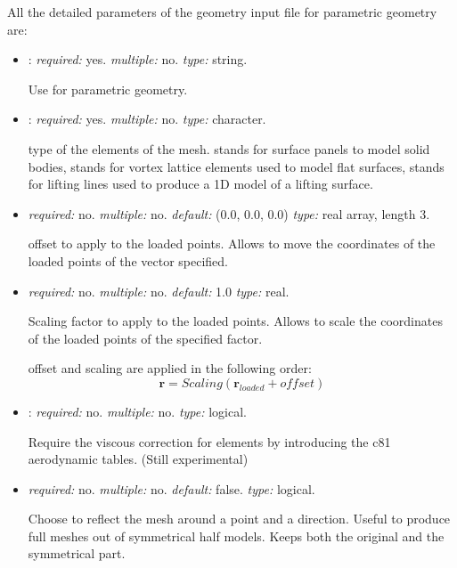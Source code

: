 All the detailed parameters of the geometry input file for parametric geometry are:
\begin{itemize}
\item {}: \textit{required:} yes. \textit{multiple:} no. \textit{type:} string. 

Use  for parametric geometry.

\item {}: \textit{required:} yes. \textit{multiple:} no. \textit{type:} character.

type of the elements of the mesh.  stands for surface panels to model solid bodies, 
 stands for vortex lattice elements used to model flat surfaces,  
stands for lifting lines used to produce a 1D model of a lifting surface. 

\item {} \textit{required:} no. \textit{multiple:} no. 
\textit{default:} (0.0, 0.0, 0.0) \textit{type:} real array, length 3.

offset to apply to the loaded points. Allows to move the coordinates of the loaded points of the vector specified. 

\item {} \textit{required:} no. \textit{multiple:} no. 
\textit{default:} 1.0 \textit{type:} real.

Scaling factor to apply to the loaded points. Allows to scale the coordinates of the loaded points of the specified factor.

offset and scaling are applied in the following order:
\begin{equation*}
\mathbf{r} = Scaling (\mathbf{r}_{loaded}+offset)
\end{equation*}


\item {}: \textit{required:} no. 
\textit{multiple:} no. \textit{type:} logical.

Require the viscous correction for  elements by introducing the c81 aerodynamic tables. (Still experimental) 


\item {} \textit{required:} no. \textit{multiple:} no. 
\textit{default:} false. \textit{type:} logical.

Choose to reflect the mesh around a point and a direction. Useful to produce full meshes out of symmetrical half models. 
Keeps both the original and the symmetrical part. 


\end{itemize}
